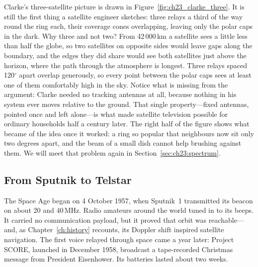
Clarke's three-satellite picture is drawn in Figure~\ref{fig:ch23_clarke_three}. It is still the
first thing a satellite engineer sketches: three relays a third of the way round the ring each,
their coverage cones overlapping, leaving only the polar caps in the dark. Why three and not two?
From 42\,000\,km a satellite sees a little less than half the globe, so two satellites on opposite
sides would leave gaps along the boundary, and the edges they did share would see both satellites
just above the horizon, where the path through the atmosphere is longest. Three relays spaced
120$^\circ$ apart overlap generously, so every point between the polar caps sees at least one of
them comfortably high in the sky. Notice what is missing from the argument: Clarke needed no
tracking antennas at all, because nothing in his system ever moves relative to the ground. That
single property---fixed antennas, pointed once and left alone---is what made satellite television
possible for ordinary households half a century later. The right half of the figure shows what
became of the idea once it worked: a ring so popular that neighbours now sit only two degrees
apart, and the beam of a small dish cannot help brushing against them. We will meet that problem
again in Section~\ref{sec:ch23:spectrum}.


\subsection{From Sputnik to Telstar}

The Space Age began on 4 October 1957, when Sputnik~1 transmitted its beacon on about 20 and
40\,MHz. Radio amateurs around the world tuned in to its beeps. It carried no communication
payload, but it proved that orbit was reachable---and, as Chapter~\ref{ch:history} recounts, its
Doppler shift inspired satellite navigation. The first voice relayed through space came a year
later: Project SCORE, launched in December 1958, broadcast a tape-recorded Christmas message from
President Eisenhower. Its batteries lasted about two weeks.

